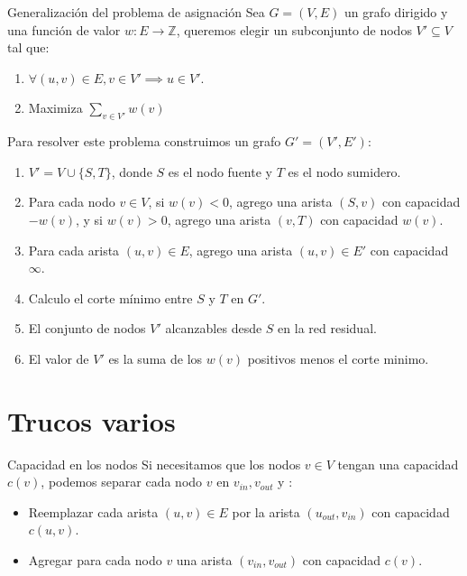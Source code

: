\documentclass{beamer}
\begin{document}
\begin{frame}{Generalización del problema de asignación}
    Sea $G = (V,E)$ un grafo dirigido y una función de valor $w:E \to \mathbb{Z}$, queremos elegir un subconjunto de nodos $V' \subseteq V$ tal que:
    \begin{enumerate}
        \item $\forall (u,v) \in E, v \in V' \implies u \in V'$.
        \item Maximiza $\sum_{v \in V'} w(v)$
    \end{enumerate}

    \pause
    Para resolver este problema construimos un grafo $G' = (V', E')$:
    \begin{enumerate}
        \item $V' = V \cup \{S, T\}$, donde $S$ es el nodo fuente y $T$ es el nodo sumidero.
        \pause
        \item Para cada nodo $v \in V$, si $w(v) < 0$, agrego una arista $(S,v)$ con capacidad $-w(v)$, y si $w(v) > 0$, agrego una arista $(v,T)$ con capacidad $w(v)$.
        \pause
        \item Para cada arista $(u,v) \in E$, agrego una arista $(u,v) \in E'$ con capacidad $\infty$.
        \pause
        \item Calculo el corte mínimo entre $S$ y $T$ en $G'$.
        \pause
        \item El conjunto de nodos $V'$ alcanzables desde $S$ en la red residual.
        \item El valor de $V'$ es la suma de los $w(v)$ positivos menos el corte minimo.
    \end{enumerate}

\end{frame}

\section{Trucos varios }

\begin{frame}{Capacidad en los nodos}
    Si necesitamos que los nodos $v \in V$ tengan una capacidad $c(v)$, podemos separar cada nodo $v$ en $v_{in}, v_{out}$ y :
    \begin{itemize}
        \item Reemplazar cada arista $(u,v) \in E$ por la arista $(u_{out}, v_{in})$ con capacidad $c(u,v)$.
        \item Agregar para cada nodo $v$ una arista $(v_{in}, v_{out})$ con capacidad $c(v)$. 
    \end{itemize}
\end{frame}
    
\end{document}
